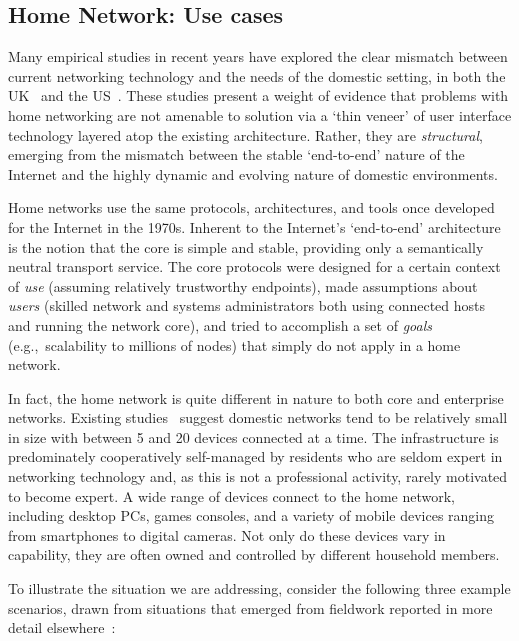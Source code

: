 \subsection{Home Network: Use cases} \label{sec:homework:use_cases}

Many empirical studies in recent years have explored the clear mismatch between
current networking technology and the needs of the domestic setting,  in both
the
UK~
and the
US~.
These studies present a weight of evidence that problems with home networking
are not amenable to solution via a `thin veneer' of user interface technology
layered atop the existing architecture.  Rather, they are \emph{structural},
emerging from the mismatch between the stable `end-to-end' nature of
the Internet and the highly dynamic and evolving nature of domestic
environments.  

Home networks use the same protocols, architectures, and tools once developed for the
Internet in the 1970s.  Inherent to the Internet's `end-to-end' architecture
is the notion that the core is simple and stable, providing only a semantically
neutral transport service.  The core protocols were designed for a certain
context of \emph{use} (assuming relatively trustworthy endpoints), made
assumptions about \emph{users} (skilled network and systems administrators both
using connected hosts and running the network core), and tried to accomplish a
set of \emph{goals} (e.g.,~scalability to millions of nodes) that simply do not
apply in a home network. 

In fact, the home network is quite different in nature to both core and
enterprise networks.  Existing studies~
suggest domestic networks tend to be relatively small in size with between 5 and
20 devices connected at a time.  The infrastructure is predominately
cooperatively self-managed by residents who are seldom expert in networking
technology and, as this is not a professional activity, rarely motivated to
become expert.  A wide range of devices connect to the home network, including
desktop PCs, games consoles, and a variety of mobile devices ranging from
smartphones to digital cameras.  Not only do these devices vary in capability,
they are often owned and controlled by different household members.  

To illustrate the situation we are addressing, consider the following three
example scenarios, drawn from  situations that emerged from fieldwork 
reported in more detail elsewhere~: 

